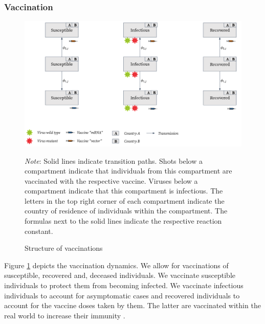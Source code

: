 \subsubsection{Vaccination}
\begin{figure}[h!]
\centering
\includegraphics[scale=0.3]{images/overview_vaccination.png}\\
\begin{flushleft}
\scriptsize{\textit{Note}: Solid lines indicate transition paths. Shots below a compartment indicate that individuals from this compartment are vaccinated with the respective vaccine. Viruses below a compartment indicate that this compartment is infectious. The letters in the top right corner of each compartment indicate the country of residence of individuals within the compartment. The formulas next to the solid lines indicate the respective reaction constant.}
\end{flushleft}
\caption{Structure of vaccinations}
\label{fig:model_vaccination_ov}
\end{figure}
Figure \ref{fig:model_vaccination_ov} depicts the vaccination dynamics. We allow for vaccinations of susceptible, recovered and, deceased individuals. We vaccinate susceptible individuals to protect them from becoming infected. We vaccinate infectious individuals to account for asymptomatic cases \citep{Byambasuren.2020} and recovered individuals to account for the vaccine doses taken by them. The latter are vaccinated within the real world to increase their immunity \citep{Skelly.2021}. \\


